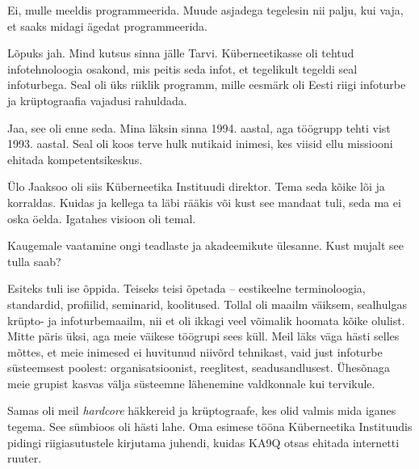 Ei, mulle meeldis programmeerida. Muude asjadega tegelesin nii palju, 
kui vaja, et saaks midagi ägedat 
programmeerida. 



Lõpuks jah. Mind kutsus sinna jälle Tarvi. 
Küberneetikasse oli tehtud infotehnoloogia osakond, mis peitis seda infot, et 
tegelikult tegeldi seal infoturbega. Seal oli üks riiklik programm, 
mille eesmärk oli Eesti riigi infoturbe ja krüptograafia vajadusi rahuldada. 


Jaa, see oli enne seda. Mina läksin sinna 1994. aastal, aga töögrupp tehti vist 1993. aastal. Seal oli koos terve hulk nutikaid inimesi, kes 
viisid ellu missiooni ehitada kompetentsikeskus.

Ülo Jaaksoo oli siis Küberneetika 
Instituudi direktor. Tema seda kõike lõi ja korraldas. Kuidas ja kellega ta läbi rääkis või kust 
see mandaat tuli, seda ma ei oska öelda. Igatahes visioon oli temal. 


Kaugemale vaatamine ongi teadlaste ja akadeemikute ülesanne. Kust mujalt 
see tulla saab? 


Esiteks tuli ise õppida. Teiseks teisi õpetada -- eestikeelne terminoloogia, 
standardid, profiilid, seminarid, koolitused. Tollal oli maailm 
väiksem, sealhulgas krüpto- ja infoturbemaailm, nii et oli
ikkagi veel võimalik hoomata kõike olulist. Mitte päris üksi,
aga meie väikese töögrupi sees küll. Meil läks väga 
hästi selles mõttes, et meie inimesed ei huvitunud niivõrd tehnikast, vaid just  
infoturbe süsteemsest poolest: organisatsioonist, reeglitest, 
seadusandlusest. Ühesõnaga meie grupist kasvas välja süsteemne lähenemine valdkonnale kui 
tervikule. 

Samas oli meil \emph{hardcore} häkkereid ja krüptograafe, kes olid valmis mida iganes tegema. See 
sümbioos oli hästi lahe. Oma esimese tööna 
Küberneetika Instituudis pidingi riigiasutustele kirjutama 
juhendi, kuidas KA9Q otsas ehitada internetti ruuter. 

